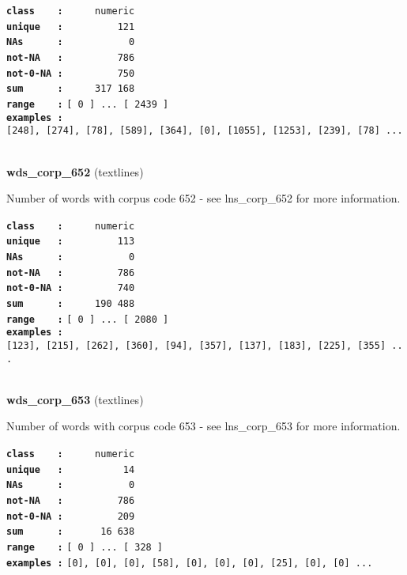 \documentclass[]{article}
\begin{document}
\textbf{\texttt{class\ \ \ \ :}} \texttt{~~~~~numeric}\\
\textbf{\texttt{unique\ \ \ :}} \texttt{~~~~~~~~~121}\\
\textbf{\texttt{NAs\ \ \ \ \ \ :}} \texttt{~~~~~~~~~~~0}\\
\textbf{\texttt{not-NA\ \ \ :}} \texttt{~~~~~~~~~786}\\
\textbf{\texttt{not-0-NA\ :}} \texttt{~~~~~~~~~750}\\
\textbf{\texttt{sum\ \ \ \ \ \ :}} \texttt{~~~~~317~168}\\
\textbf{\texttt{range\ \ \ \ :}}
\texttt{{[}\ 0\ {]}\ ...\ {[}\ 2439\ {]}}\\
\textbf{\texttt{examples\ :}}
\texttt{{[}248{]},\ {[}274{]},\ {[}78{]},\ {[}589{]},\ {[}364{]},\ {[}0{]},\ {[}1055{]},\ {[}1253{]},\ {[}239{]},\ {[}78{]}\ ...}\\

~

\textbf{wds\_corp\_652} (textlines)

Number of words with corpus code 652 - see lns\_corp\_652 for more
information.

\textbf{\texttt{class\ \ \ \ :}} \texttt{~~~~~numeric}\\
\textbf{\texttt{unique\ \ \ :}} \texttt{~~~~~~~~~113}\\
\textbf{\texttt{NAs\ \ \ \ \ \ :}} \texttt{~~~~~~~~~~~0}\\
\textbf{\texttt{not-NA\ \ \ :}} \texttt{~~~~~~~~~786}\\
\textbf{\texttt{not-0-NA\ :}} \texttt{~~~~~~~~~740}\\
\textbf{\texttt{sum\ \ \ \ \ \ :}} \texttt{~~~~~190~488}\\
\textbf{\texttt{range\ \ \ \ :}}
\texttt{{[}\ 0\ {]}\ ...\ {[}\ 2080\ {]}}\\
\textbf{\texttt{examples\ :}}
\texttt{{[}123{]},\ {[}215{]},\ {[}262{]},\ {[}360{]},\ {[}94{]},\ {[}357{]},\ {[}137{]},\ {[}183{]},\ {[}225{]},\ {[}355{]}\ ...}\\

~

\textbf{wds\_corp\_653} (textlines)

Number of words with corpus code 653 - see lns\_corp\_653 for more
information.

\textbf{\texttt{class\ \ \ \ :}} \texttt{~~~~~numeric}\\
\textbf{\texttt{unique\ \ \ :}} \texttt{~~~~~~~~~~14}\\
\textbf{\texttt{NAs\ \ \ \ \ \ :}} \texttt{~~~~~~~~~~~0}\\
\textbf{\texttt{not-NA\ \ \ :}} \texttt{~~~~~~~~~786}\\
\textbf{\texttt{not-0-NA\ :}} \texttt{~~~~~~~~~209}\\
\textbf{\texttt{sum\ \ \ \ \ \ :}} \texttt{~~~~~~16~638}\\
\textbf{\texttt{range\ \ \ \ :}}
\texttt{{[}\ 0\ {]}\ ...\ {[}\ 328\ {]}}\\
\textbf{\texttt{examples\ :}}
\texttt{{[}0{]},\ {[}0{]},\ {[}0{]},\ {[}58{]},\ {[}0{]},\ {[}0{]},\ {[}0{]},\ {[}25{]},\ {[}0{]},\ {[}0{]}\ ...}\\
\end{document}
